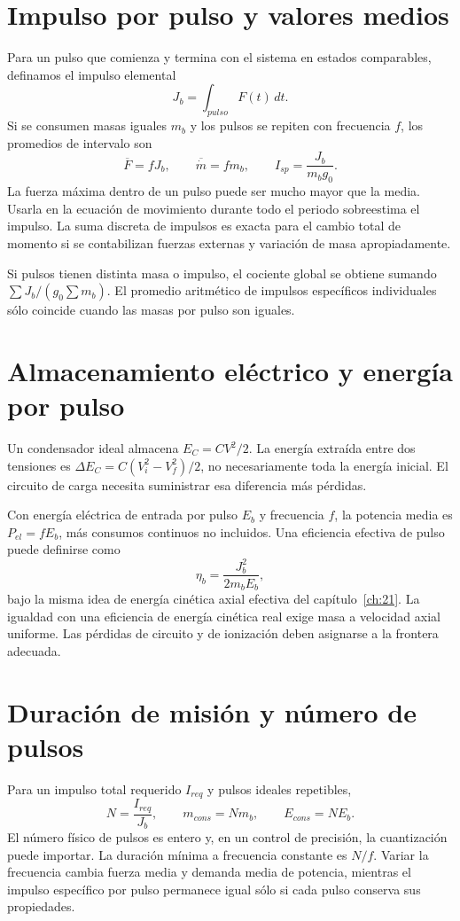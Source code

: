 \section{Impulso por pulso y valores medios}
Para un pulso que comienza y termina con el sistema en estados comparables, definamos el impulso elemental
\[
 J_b=\int_{pulso}F(t)\,dt.
\]
Si se consumen masas iguales $m_b$ y los pulsos se repiten con frecuencia $f$, los promedios de intervalo son
\begin{equation}\label{eq:pulse}
 \overline F=fJ_b,\qquad
 \overline{\dot m}=fm_b,\qquad
 I_{sp}=\frac{J_b}{m_bg_0}.
\end{equation}
La fuerza máxima dentro de un pulso puede ser mucho mayor que la media. Usarla en la ecuación de movimiento durante todo el periodo sobreestima el impulso. La suma discreta de impulsos es exacta para el cambio total de momento si se contabilizan fuerzas externas y variación de masa apropiadamente.

Si pulsos tienen distinta masa o impulso, el cociente global se obtiene sumando $\sum J_b/(g_0\sum m_b)$. El promedio aritmético de impulsos específicos individuales sólo coincide cuando las masas por pulso son iguales.
\section{Almacenamiento eléctrico y energía por pulso}
Un condensador ideal almacena $E_C=CV^2/2$. La energía extraída entre dos tensiones es $\Delta E_C=C(V_i^2-V_f^2)/2$, no necesariamente toda la energía inicial. El circuito de carga necesita suministrar esa diferencia más pérdidas.

Con energía eléctrica de entrada por pulso $E_b$ y frecuencia $f$, la potencia media es $P_{el}=fE_b$, más consumos continuos no incluidos. Una eficiencia efectiva de pulso puede definirse como
\[
 \eta_b=\frac{J_b^2}{2m_bE_b},
\]
bajo la misma idea de energía cinética axial efectiva del capítulo~\ref{ch:21}. La igualdad con una eficiencia de energía cinética real exige masa a velocidad axial uniforme. Las pérdidas de circuito y de ionización deben asignarse a la frontera adecuada.
\section{Duración de misión y número de pulsos}
Para un impulso total requerido $I_{req}$ y pulsos ideales repetibles,
\[
 N=\frac{I_{req}}{J_b},\qquad
 m_{cons}=Nm_b,\qquad E_{cons}=NE_b.
\]
El número físico de pulsos es entero y, en un control de precisión, la cuantización puede importar. La duración mínima a frecuencia constante es $N/f$. Variar la frecuencia cambia fuerza media y demanda media de potencia, mientras el impulso específico por pulso permanece igual sólo si cada pulso conserva sus propiedades.

